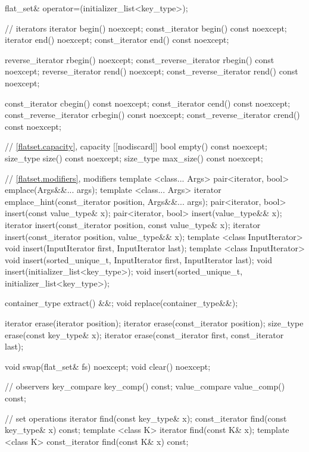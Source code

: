 \begin{codeblock}
\begin{codeblock}
\begin{codeblock}
\begin{addedblock}
\begin{codeblock}
{{    flat_set& operator=(initializer_list<key_type>);

    // iterators
    iterator               begin() noexcept;
    const_iterator         begin() const noexcept;
    iterator               end() noexcept;
    const_iterator         end() const noexcept;

    reverse_iterator       rbegin() noexcept;
    const_reverse_iterator rbegin() const noexcept;
    reverse_iterator       rend() noexcept;
    const_reverse_iterator rend() const noexcept;

    const_iterator         cbegin() const noexcept;
    const_iterator         cend() const noexcept;
    const_reverse_iterator crbegin() const noexcept;
    const_reverse_iterator crend() const noexcept;

    // \ref{flatset.capacity}, capacity
    [[nodiscard]] bool empty() const noexcept;
    size_type size() const noexcept;
    size_type max_size() const noexcept;

    // \ref{flatset.modifiers}, modifiers
    template <class... Args> pair<iterator, bool> emplace(Args&&... args);
    template <class... Args>
      iterator emplace_hint(const_iterator position, Args&&... args);
    pair<iterator, bool> insert(const value_type& x);
    pair<iterator, bool> insert(value_type&& x);
    iterator insert(const_iterator position, const value_type& x);
    iterator insert(const_iterator position, value_type&& x);
    template <class InputIterator>
      void insert(InputIterator first, InputIterator last);
    template <class InputIterator>
      void insert(sorted_unique_t, InputIterator first, InputIterator last);
    void insert(initializer_list<key_type>);
    void insert(sorted_unique_t, initializer_list<key_type>);

    container_type extract() &&;
    void replace(container_type&&);

    iterator erase(iterator position);
    iterator erase(const_iterator position);
    size_type erase(const key_type& x);
    iterator erase(const_iterator first, const_iterator last);

    void swap(flat_set& fs) noexcept;
    void clear() noexcept;

    // observers
    key_compare key_comp() const;
    value_compare value_comp() const;

    // set operations
    iterator find(const key_type& x);
    const_iterator find(const key_type& x) const;
    template <class K> iterator find(const K& x);
    template <class K> const_iterator find(const K& x) const;

}}
\end{codeblock}
\end{addedblock}
\end{codeblock}
\end{codeblock}
\end{codeblock}
